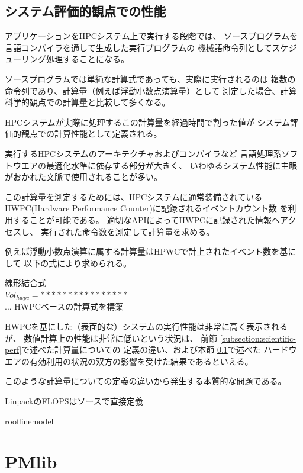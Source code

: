 \documentclass[submit,techrep,noauthor]{ipsj}
\begin{document}
\subsection {システム評価的観点での性能}
\label{subsection:system-perf}

アプリケーションをHPCシステム上で実行する段階では、
ソースプログラムを言語コンパイラを通して生成した実行プログラムの
機械語命令列としてスケジューリング処理することになる。

ソースプログラムでは単純な計算式であっても、実際に実行されるのは
複数の命令列であり、計算量（例えば浮動小数点演算量）として
測定した場合、計算科学的観点での計算量と比較して多くなる。

HPCシステムが実際に処理するこの計算量を経過時間で割った値が
システム評価的観点での計算性能として定義される。

実行するHPCシステムのアーキテクチャおよびコンパイラなど
言語処理系ソフトウエアの最適化水準に依存する部分が大きく、
いわゆるシステム性能に主眼がおかれた文脈で使用されることが多い。

この計算量を測定するためには、HPCシステムに通常装備されている
HWPC(Hardware Performance Counter)に記録されるイベントカウント数
を利用することが可能である。
適切なAPIによってHWPCに記録された情報へアクセスし、
実行された命令数を測定して計算量を求める。

例えば浮動小数点演算に属する計算量はHPWCで計上されたイベント数を基にして
以下の式により求められる。

{ \color{blue}
線形結合式\\
\begin{math}
Vol_{hwpc} = ****************
\end{math}\\
... HWPCベースの計算式を構築
}

HWPCを基にした（表面的な）システムの実行性能は非常に高く表示されるが、
数値計算上の性能は非常に低いという状況は、
前節 \ref{subsection:scientific-perf}で述べた計算量についての
定義の違い、および本節 \ref{subsection:system-perf}で述べた
ハードウエアの有効利用の状況の双方の影響を受けた結果であるといえる。

このような計算量についての定義の違いから発生する本質的な問題である。



LinpackのFLOPSはソースで直接定義


rooflinemodel



\section{PMlib}
\end{document}
